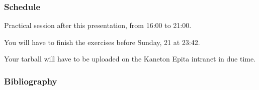 \begin{frame}
  \frametitle{Schedule}

  Practical session after this presentation, from 16:00 to 21:00.

  \-

  You will have to finish the exercises before Sunday, 21 at 23:42.

  \-

  Your tarball will have to be uploaded on the Kaneton Epita intranet in due time.
\end{frame}

%
%

\begin{frame}
  \frametitle{Bibliography}

  
  
\end{frame}


